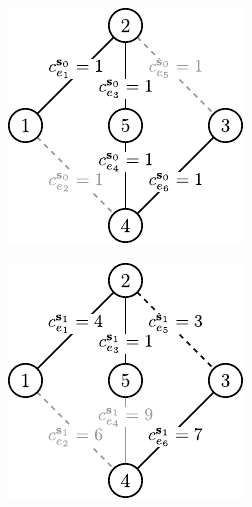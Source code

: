 \begin{figure}[!htbp]
	\null\hfill
	\begin{subfigure}[b]{0.3\textwidth}
		\includegraphics[width=\textwidth]{Chapter_II/ROB-INC-MST-example/a1}
		\caption{}
		\label{fig:robincrexample:a}
	\end{subfigure}
	\hfill
	\begin{subfigure}[b]{0.3\textwidth}
		\includegraphics[width=\textwidth]{Chapter_II/ROB-INC-MST-example/b1}

\end{subfigure}
\end{figure}

